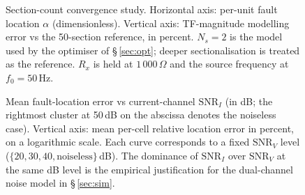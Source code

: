 \documentclass[journal]{IEEEtran}
\begin{document}
\begin{figure}[!t]
  \centering
  \caption{Section-count convergence study.  Horizontal axis:
           per-unit fault location $\alpha$ (dimensionless).
           Vertical axis: TF-magnitude modelling error vs the
           50-section reference, in percent.  $N_s = 2$ is the model
           used by the optimiser of \S\,\ref{sec:opt}; deeper
           sectionalisation is treated as the reference.  $R_x$ is
           held at $1\,000$\,$\Omega$ and the source frequency at
           $f_0 = 50$\,Hz.}
  \label{fig:section_convergence}
\end{figure}

\begin{figure}[!t]
  \centering
  \caption{Mean fault-location error vs current-channel
           $\mathrm{SNR}_I$ (in dB; the rightmost cluster at 50\,dB on
           the abscissa denotes the noiseless case).  Vertical axis:
           mean per-cell relative location error in percent, on a
           logarithmic scale.  Each curve corresponds to a fixed
           $\mathrm{SNR}_V$ level
           ($\{20,30,40,\mathrm{noiseless}\}$\,dB).  The dominance of
           $\mathrm{SNR}_I$ over $\mathrm{SNR}_V$ at the same dB level
           is the empirical justification for the dual-channel noise
           model in \S\,\ref{sec:sim}.}
  \label{fig:snr_sweep}
\end{figure}
\end{document}
